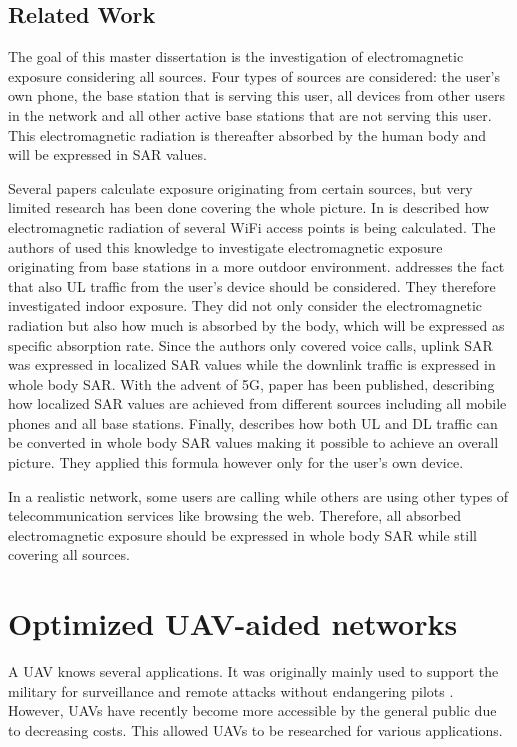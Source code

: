 \subsection{Related Work} %
\label{sub:general}
The goal of this master dissertation is the investigation of electromagnetic exposure considering all sources. Four types of sources are considered: the user's own phone,
 the base station that is serving this user, 
all devices from other users in the network and all 
other active base stations that are not serving this user. This electromagnetic radiation is thereafter
absorbed by the human body and will be expressed in SAR values.

Several papers calculate exposure originating from certain sources, but very  limited research has been done covering the whole picture.
In \cite{J6_originalExposureFormula} is described how electromagnetic radiation of several WiFi access points is being calculated. The authors of \cite{J1} used this knowledge 
to investigate electromagnetic exposure originating from base stations in a more outdoor environment. \cite{J10_RDP, J10.1} addresses the fact that 
also \gls{UL} traffic from the user's device should be considered. They therefore investigated indoor exposure. They did not only consider the electromagnetic radiation
but also how much is absorbed by the body, which will be expressed as specific absorption rate. Since the authors only covered voice calls,
uplink SAR was expressed in localized SAR values while the downlink traffic is expressed in whole body SAR. With the advent of 5G, paper \cite{J17_kuehn2019modelling} has been 
published, describing how localized SAR values are achieved from different sources including all mobile phones and all base stations.
Finally, \cite{J22_plets2015joint} describes how both \gls{UL} and \gls{DL} traffic can be converted in whole body SAR values making it possible to achieve an overall picture. They applied this formula 
however only for the user's own device.

In a realistic network, some users are calling while others are using other types of telecommunication services like browsing the web.
Therefore, all absorbed electromagnetic exposure should be expressed in whole body SAR while still covering all sources.

\section{Optimized UAV-aided networks}

A \gls{UAV} knows several applications. It was originally mainly used to support the military for surveillance and remote attacks without 
endangering pilots \cite{U12}. However, \gls{UAV}s have recently become more accessible by the general public due to decreasing costs. This 
allowed \gls{UAV}s to be researched for various applications.

